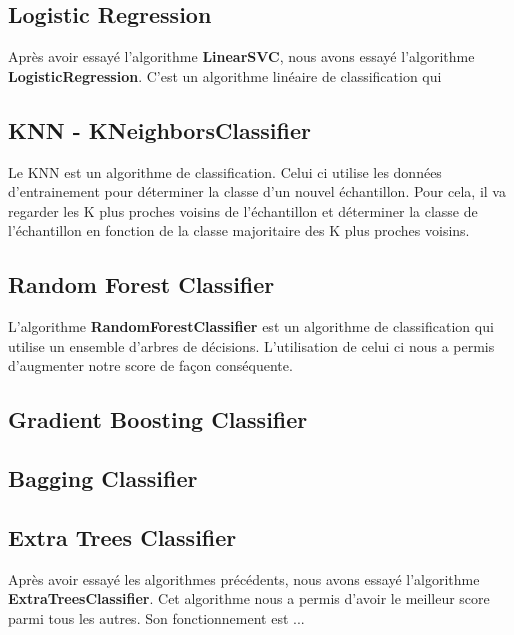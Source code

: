 \documentclass[../rapport.tex]{subfiles}
\begin{document}
\subsection{Logistic Regression}
Après avoir essayé l'algorithme \textbf{LinearSVC}, nous avons essayé l'algorithme \textbf{LogisticRegression}. C'est un algorithme linéaire de classification qui

\subsection{KNN - KNeighborsClassifier}
Le KNN est un algorithme de classification. Celui ci utilise les données d'entrainement pour déterminer la classe d'un nouvel échantillon. Pour cela, il va regarder les K plus proches voisins de l'échantillon et déterminer la classe de l'échantillon en fonction de la classe majoritaire des K plus proches voisins.
\subsection{Random Forest Classifier}
L'algorithme \textbf{RandomForestClassifier} est un algorithme de classification qui utilise un ensemble d'arbres de décisions. L'utilisation de celui ci nous a permis d'augmenter notre score de façon conséquente.
\subsection{Gradient Boosting Classifier}

\subsection{Bagging Classifier}

\subsection{Extra Trees Classifier}
Après avoir essayé les algorithmes précédents, nous avons essayé l'algorithme \textbf{ExtraTreesClassifier}. Cet algorithme nous a permis d'avoir le meilleur score parmi tous les autres. Son fonctionnement est ...
\end{document}
